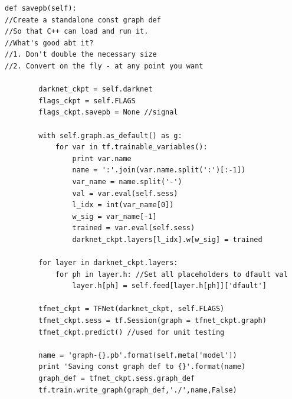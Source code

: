 \vspace{5mm}
\begin{lstlisting}
def savepb(self):
//Create a standalone const graph def
//So that C++ can load and run it.
//What's good abt it?
//1. Don't double the necessary size
//2. Convert on the fly - at any point you want
	
		darknet_ckpt = self.darknet
		flags_ckpt = self.FLAGS
		flags_ckpt.savepb = None //signal
		
		with self.graph.as_default() as g:
			for var in tf.trainable_variables():
				print var.name
				name = ':'.join(var.name.split(':')[:-1])
				var_name = name.split('-')
				val = var.eval(self.sess)
				l_idx = int(var_name[0])
				w_sig = var_name[-1]
				trained = var.eval(self.sess)
				darknet_ckpt.layers[l_idx].w[w_sig] = trained

		for layer in darknet_ckpt.layers:
			for ph in layer.h: //Set all placeholders to dfault val
				layer.h[ph] = self.feed[layer.h[ph]]['dfault']

		tfnet_ckpt = TFNet(darknet_ckpt, self.FLAGS)		
		tfnet_ckpt.sess = tf.Session(graph = tfnet_ckpt.graph)
		tfnet_ckpt.predict() //used for unit testing

		name = 'graph-{}.pb'.format(self.meta['model'])
		print 'Saving const graph def to {}'.format(name)
		graph_def = tfnet_ckpt.sess.graph_def
		tf.train.write_graph(graph_def,'./',name,False)
\end{lstlisting}


